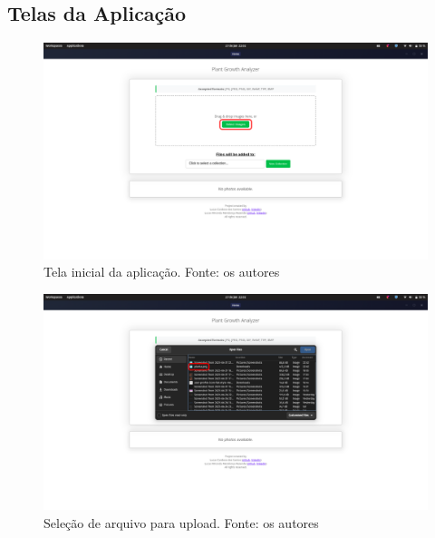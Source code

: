 \subsection{Telas da Aplicação}

\begin{figure}[H]
    \centering
    \includegraphics[width=1\textwidth]{../figures/screens/uc001/Screenshot from 2025-06-27 22-02-51.png}
    \caption{Tela inicial da aplicação. Fonte: os autores}
    \label{fig:uc001-screen1}
\end{figure}

\begin{figure}[H]
    \centering
    \includegraphics[width=1\textwidth]{../figures/screens/uc001/Screenshot from 2025-06-27 22-02-56.png}
    \caption{Seleção de arquivo para upload. Fonte: os autores}
    \label{fig:uc001-screen2}
\end{figure}

